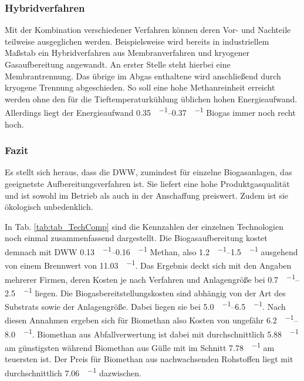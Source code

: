 \subsubsection{Hybridverfahren}
Mit der Kombination verschiedener Verfahren können deren Vor- und Nachteile teilweise ausgeglichen werden. Beispielsweise wird bereits in industriellem Maßstab ein Hybridverfahren aus Membranverfahren und kryogener Gasaufbereitung angewandt. An erster Stelle steht hierbei eine Membrantrennung. Das übrige im Abgas enthaltene  wird anschließend durch kryogene Trennung abgeschieden. So soll eine hohe Methanreinheit erreicht werden ohne den für die Tieftemperaturkühlung üblichen hohen Energieaufwand. Allerdings liegt der Energieaufwand \SIrange{0,35}{0,37}{\sieuro\per\normvol} Biogas immer noch recht hoch. \parencite{dena2019}\smallskip


\subsubsection{Fazit}
Es stellt sich heraus, dass die \gls{DWW}, zumindest für einzelne Biogasanlagen, das geeignetste Aufbereitungsverfahren ist. Sie liefert eine hohe Produktgasqualität und ist sowohl im Betrieb als auch in der Anschaffung preiswert. Zudem ist sie ökologisch unbedenklich.\smallskip

In Tab. \ref{tab:tab_TechComp} sind die Kennzahlen der einzelnen Technologien noch einmal zusammenfassend dargestellt. Die Biogasaufbereitung kostet demnach mit \gls{DWW} \SIrange{0,13}{0,16}{\sieuro\per\normvol} Methan, also \SIrange{1,2}{1,5}{\ct\per\kwh} ausgehend von einem Brennwert von \SI{11,03}{\kwh\per\normvol}. Das Ergebnis deckt sich mit den Angaben mehrerer Firmen, deren Kosten je nach Verfahren und Anlagengröße bei \SIrange{0,7}{2,5}{\ct\per\kwh} liegen. Die Biogasbereitstellungskosten sind abhängig von der Art des Substrats sowie der Anlagengröße. Dabei liegen sie bei \SIrange{5,0}{6,5}{\ct\per\kwh}. Nach diesen Annahmen ergeben sich für Biomethan also Kosten von ungefähr \SIrange{6,2}{8,0}{\ct\per\kwh}. Biomethan aus Abfallverwertung ist dabei mit durchschnittlich \SI{5,88}{\ct\per\kwh} am günstigsten während Biomethan aus Gülle mit im Schnitt \SI{7,78}{\ct\per\kwh} am teuersten ist. Der Preis für Biomethan aus nachwachsenden Rohstoffen liegt mit durchschnittlich \SI{7,06}{\ct\per\kwh} dazwischen. \parencite{FNR14} \parencite{meier14} \parencite{dena19}




